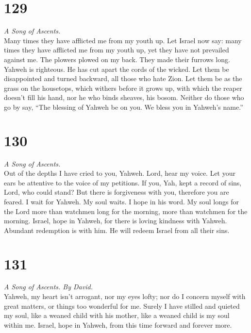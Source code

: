 \hypertarget{section-128}{%
\section{129}\label{section-128}}

\emph{A Song of Ascents.}\\
 Many times they have afflicted me from my youth up. Let
Israel now say:  many times they have afflicted me from my
youth up, yet they have not prevailed against me.  The
plowers plowed on my back. They made their furrows long. 
Yahweh is righteous. He has cut apart the cords of the wicked.
 Let them be disappointed and turned backward, all those
who hate Zion.  Let them be as the grass on the housetops,
which withers before it grows up,  with which the reaper
doesn't fill his hand, nor he who binds sheaves, his bosom.
 Neither do those who go by say, ``The blessing of Yahweh
be on you. We bless you in Yahweh's name.''

\hypertarget{section-129}{%
\section{130}\label{section-129}}

\emph{A Song of Ascents.}\\
 Out of the depths I have cried to you, Yahweh.
 Lord, hear my voice. Let your ears be attentive to the
voice of my petitions.  If you, Yah, kept a record of
sins, Lord, who could stand?  But there is forgiveness
with you, therefore you are feared.  I wait for Yahweh. My
soul waits. I hope in his word.  My soul longs for the
Lord more than watchmen long for the morning, more than watchmen for the
morning.  Israel, hope in Yahweh, for there is loving
kindness with Yahweh. Abundant redemption is with him.  He
will redeem Israel from all their sins.

\hypertarget{section-130}{%
\section{131}\label{section-130}}

\emph{A Song of Ascents. By David.}\\
 Yahweh, my heart isn't arrogant, nor my eyes lofty; nor
do I concern myself with great matters, or things too wonderful for me.
 Surely I have stilled and quieted my soul, like a weaned
child with his mother, like a weaned child is my soul within me.
 Israel, hope in Yahweh, from this time forward and
forever more.

